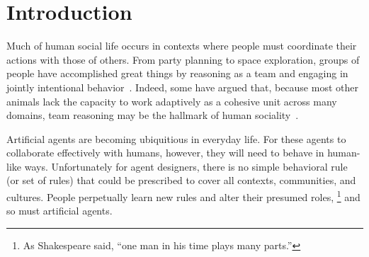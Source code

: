 
\section{Introduction}
\label{sec:intro}

Much of human social life occurs in contexts where people must
coordinate their actions with those of others.  From party planning to
space exploration, groups of people have accomplished great things by
reasoning as a team and engaging in jointly intentional
behavior~\cite{searle1995construction}.  Indeed, some have argued
that, because most other animals lack the capacity to work adaptively
as a cohesive unit across many domains, team reasoning may be the
hallmark of human sociality~\cite{tomasello2005understanding}.


Artificial agents are becoming ubiquitious in everyday life.  For
these agents to collaborate effectively with humans, however, they will
need to behave in human-like ways.  Unfortunately for agent designers,
there is no simple behavioral rule (or set of rules) that could be
prescribed to cover all contexts, communities, and cultures.  People
perpetually learn new rules and alter their presumed roles,%
\footnote{As Shakespeare said, ``one man in his time plays many parts.''}
and so must artificial agents.




